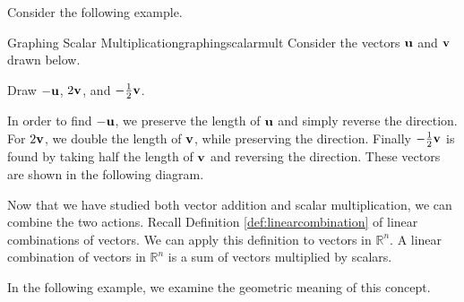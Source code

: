 Consider the following example.

\begin{example}{Graphing Scalar Multiplication}{graphingscalarmult}
Consider the vectors ${\bf u}$ and ${\bf v}$ drawn below. 

\begin{center}
\end{center}

Draw  $-{\bf u}$, $2{\bf v}$, and $-\frac{1}{2}{\bf v}$.
\end{example}

\begin{solution}

In order to find $-{\bf u}$, we preserve the length of ${\bf u}$ and simply reverse the direction.
For $2{\bf v}$, we double the length of ${\bf v}$, while preserving the direction. Finally 
$-\frac{1}{2}{\bf v}$ is found by taking half the length of ${\bf v}$ and reversing the direction. 
These vectors are shown in the following diagram. 

\begin{center}
\end{center}

\end{solution}

Now that we have studied both vector addition and scalar multiplication, we can combine the two actions. Recall 
Definition \ref{def:linearcombination} of linear combinations of vectors. We can apply this definition to 
vectors in $\mathbb{R}^n$. A linear combination of vectors in $\mathbb{R}^n$ is a sum of vectors multiplied by scalars.

In the following example, we examine the geometric meaning of this concept. 


